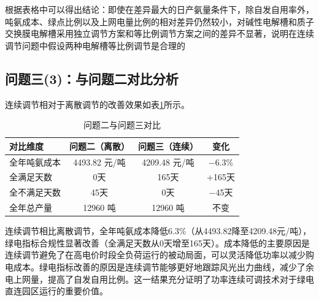 根据表格中可以得出结论：即使在差异最大的日产氨量条件下，除自发自用率外，吨氨成本、绿点比例以及上网电量比例的相对差异仍然较小，对碱性电解槽和质子交换膜电解槽采用独立调节方案和等比例调节方案之间的差异不显著，说明在连续调节问题中假设两种电解槽等比例调节是合理的

\subsection{问题三(3)：与问题二对比分析}


连续调节相对于离散调节的改善效果如表\ref{tab:q3_vs_q2}所示。
\vspace*{-\baselineskip}
\begin{table}[H]
\centering
\caption{问题二与问题三对比}\label{tab:q3_vs_q2}
\renewcommand{\arraystretch}{0.9}
\begin{tabular}{lccc}
\toprule
对比维度 & 问题二（离散） & 问题三（连续） & 变化 \\
\midrule
全年吨氨成本 & 4493.82 元/吨 & 4209.48 元/吨 & $-$6.3\% \\
全满足天数 & 0天 & 165天 & +165天 \\
全不满足天数 & 45天 & 0天 & $-$45天 \\
全年总产量 & 12960 吨 & 12960 吨 & 不变 \\
\bottomrule
\end{tabular}
\end{table}

连续调节相比离散调节，全年吨氨成本降低6.3\%（从4493.82降至4209.48元/吨），绿电指标合规性显著改善（全满足天数从0天增至165天）。成本降低的主要原因是连续调节避免了在高电价时段全负荷运行的被动局面，可以灵活降低功率以减少购电成本。绿电指标改善的原因是连续调节能够更好地跟踪风光出力曲线，减少了余电上网量，提高了自发自用比例。这一结果充分证明了功率连续可调技术对于绿电直连园区运行的重要价值。
